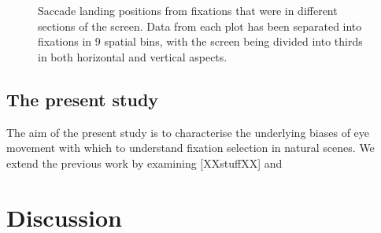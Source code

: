 \documentclass[a4paper, twocolumn, oneside, 11pt]{article}
\begin{document}
\begin{figure}[htb]
\caption{Saccade landing positions from fixations that were in different sections of the screen. Data from each plot has been separated into fixations in 9 spatial bins, with the screen being divided into thirds in both horizontal and vertical aspects.}
\label{fig:empiricalSaccadicFlow}
\end{figure}


\subsection{The present study}
The aim of the present study is to characterise the underlying biases of eye movement with which to understand fixation selection in natural scenes. We extend the previous work by examining [XXstuffXX] and 








\section{Discussion}
\end{document}

